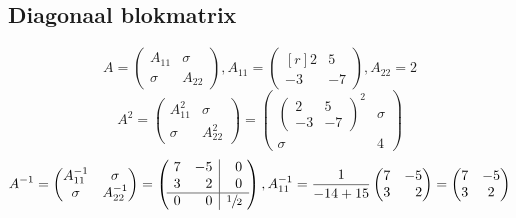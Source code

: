 \subsection{Diagonaal blokmatrix}
\[A = \begin{pmatrix} A_{11} & \sigma \\
\sigma & A_{22} \end{pmatrix}, A_{11} = \begin{pmatrix*}[r] 2 & 5 \\ -3 & -7 \end{pmatrix*}, A_{22} = 2 \]
\[ A^2 = \begin{pmatrix} A_{11}^2 & \sigma \\
\sigma & A_{22}^2 \end{pmatrix} = \begin{pmatrix} \begin{pmatrix*} 2 & 5 \\ -3 & -7 \end{pmatrix*}^2 & \sigma \\
\sigma & 4 \end{pmatrix} \]
\[ A^{-1} = \begin{pmatrix} A_{11}^{-1} & \sigma \\
\sigma & A_{22}^{-1} \end{pmatrix} = \left(\!\begin{array}{rr|r} 7 & -5 & 0 \\
3 & 2 & 0 \\ \hline
0 & 0 & \sfrac{1}{2} \end{array}\!\right), A_{11}^{-1} = \frac{1}{-14+15} \begin{pmatrix*}[r] 7 & -5 \\ 3 & 2 \end{pmatrix*} = \begin{pmatrix*} 7 & -5 \\ 3 & 2 \end{pmatrix*} \]

